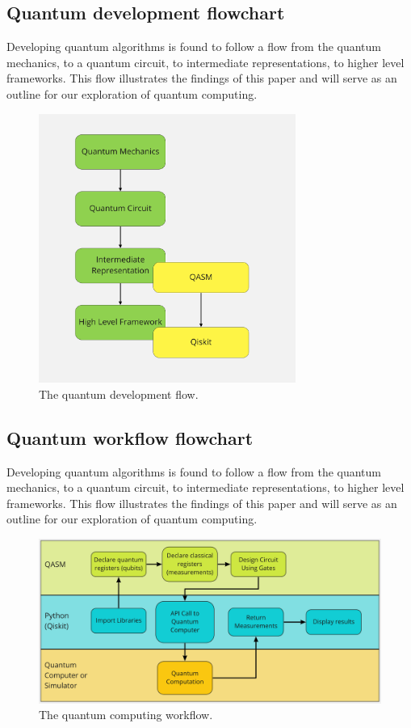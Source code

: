\documentclass{article}
\begin{document}
\subsection{Quantum development flowchart}
Developing quantum algorithms is found to follow a flow from the quantum mechanics, to a quantum circuit, to intermediate representations, to higher level frameworks. This flow illustrates the findings of this paper and will serve as an outline for our exploration of quantum computing. 
\begin{figure}[H]
    \centering
    \includegraphics[width=0.75\textwidth]{flowchart.png}
    \caption{The quantum development flow.}
\end{figure}



\subsection{Quantum workflow flowchart}
Developing quantum algorithms is found to follow a flow from the quantum mechanics, to a quantum circuit, to intermediate representations, to higher level frameworks. This flow illustrates the findings of this paper and will serve as an outline for our exploration of quantum computing. 
\begin{figure}[H]
    \centering
    \includegraphics[width=1.0\textwidth]{qworkflow.png}
    \caption{The quantum computing workflow.}
\end{figure}
\end{document}
